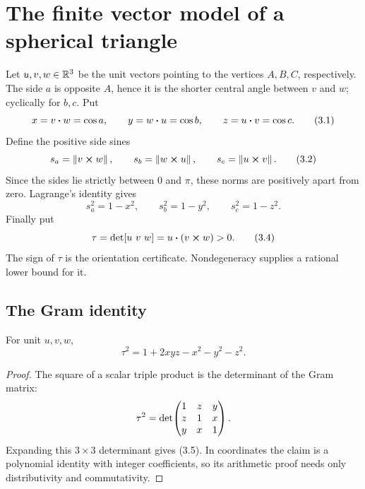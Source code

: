 \section{The finite vector model of a spherical triangle}
\label{sec:vector-model}

Let \(u,v,w\in\mathbb R^3\) be the unit vectors pointing to the vertices
\(A,B,C\), respectively.  The side \(a\) is opposite \(A\), hence it is the
shorter central angle between \(v\) and \(w\); cyclically for \(b,c\).  Put
\begin{equation}
 x=v\mathbin{\boldsymbol{\cdot}} w=\cos a,\qquad
 y=w\mathbin{\boldsymbol{\cdot}} u=\cos b,\qquad
 z=u\mathbin{\boldsymbol{\cdot}} v=\cos c.                                         \tag{3.1}
\end{equation}
Define the positive side sines
\begin{equation}
 s_a=\left\lVert v\mathbin{\boldsymbol{\times}} w\right\rVert,\qquad
 s_b=\left\lVert w\mathbin{\boldsymbol{\times}} u\right\rVert,\qquad
 s_c=\left\lVert u\mathbin{\boldsymbol{\times}} v\right\rVert.                                    \tag{3.2}
\end{equation}
Since the sides lie strictly between \(0\) and \(\pi\), these norms are
positively apart from zero.  Lagrange's identity gives
\begin{equation}
 s_a^2=1-x^2,\qquad s_b^2=1-y^2,\qquad s_c^2=1-z^2.          \tag{3.3}
\end{equation}
Finally put
\begin{equation}
 \tau=\detm[u\ v\ w]=u\dotp(v\crossp w)>0.                 \tag{3.4}
\end{equation}
The sign of \(\tau\) is the orientation certificate.  Nondegeneracy supplies a
rational lower bound for it.

\subsection{The Gram identity}

\begin{lemma}
\label{lem:gram}
For unit \(u,v,w\),
\begin{equation}
 \tau^2=1+2xyz-x^2-y^2-z^2.                                 \tag{3.5}
\end{equation}
\end{lemma}

\begin{proof}
The square of a scalar triple product is the determinant of the Gram matrix:
\[
 \tau^2=
 \operatorname{det}\!\begin{pmatrix}
 1&z&y\\ z&1&x\\ y&x&1
 \end{pmatrix}.
\]
Expanding this \(3\times3\) determinant gives (3.5).  In coordinates the claim
is a polynomial identity with integer coefficients, so its arithmetic proof
needs only distributivity and commutativity.
\end{proof}

